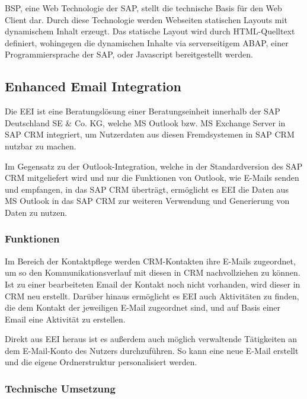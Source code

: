 \ac{BSP}, eine Web Technologie der SAP, stellt die technische Basis für den Web Client dar. Durch diese Technologie werden Webseiten statischen Layouts mit dynamischem Inhalt erzeugt. Das statische Layout wird durch \ac{HTML}-Quelltext definiert, wohingegen die dynamischen Inhalte via serverseitigem ABAP, einer Programmiersprache der SAP, oder Javascript bereitgestellt werden. \cite[S. 212]{Fuchsle.2009}

\subsection{Enhanced Email Integration}

Die \ac{EEI} ist eine Beratungslösung einer Beratungseinheit innerhalb der SAP Deutschland SE \& Co. KG, welche \ac{MS} Outlook bzw. \ac{MS} Exchange Server in SAP \ac{CRM} integriert, um Nutzerdaten aus diesen Fremdsystemen in SAP \ac{CRM} nutzbar zu machen. \cite[S. 5]{SAPAG.2011}

Im Gegensatz zu der Outlook-Integration, welche in der Standardversion des SAP CRM mitgeliefert wird und nur die Funktionen von Outlook, wie E-Mails senden und empfangen, in das SAP \ac{CRM} überträgt, \cite[S. 67]{Fuchsle.2009} ermöglicht es \ac{EEI} die Daten aus \ac{MS} Outlook in das SAP CRM zur weiteren Verwendung und Generierung von Daten zu nutzen. \cite[S. 6-7]{SAPAG.2011}

\subsubsection{Funktionen}

Im Bereich der Kontaktpflege werden \ac{CRM}-Kontakten ihre E-Mails zugeordnet, um so den Kommunikationsverlauf mit diesen in \ac{CRM} nachvollziehen zu können. Ist zu einer bearbeiteten Email der Kontakt noch nicht vorhanden, wird dieser in \ac{CRM} neu erstellt. Darüber hinaus ermöglicht es \ac{EEI} auch Aktivitäten zu finden, die dem Kontakt der jeweiligen E-Mail zugeordnet sind, und auf Basis einer Email eine Aktivität zu erstellen. \cite[S. 6-7]{SAPAG.2011}

Direkt aus \ac{EEI} heraus ist es außerdem auch möglich verwaltende Tätigkeiten an dem E-Mail-Konto des Nutzers durchzuführen. So kann eine neue E-Mail erstellt und die eigene Ordnerstruktur personalisiert werden. \cite[S. 7]{SAPAG.2011}

\subsubsection{Technische Umsetzung}

